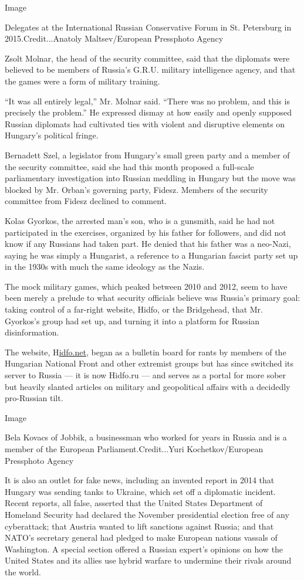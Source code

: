 Image

Delegates at the International Russian Conservative Forum in St.
Petersburg in 2015.Credit...Anatoly Maltsev/European Pressphoto Agency

Zsolt Molnar, the head of the security committee, said that the
diplomats were believed to be members of Russia's G.R.U. military
intelligence agency, and that the games were a form of military
training.

``It was all entirely legal,'' Mr. Molnar said. ``There was no problem,
and this is precisely the problem.'' He expressed dismay at how easily
and openly supposed Russian diplomats had cultivated ties with violent
and disruptive elements on Hungary's political fringe.

Bernadett Szel, a legislator from Hungary's small green party and a
member of the security committee, said she had this month proposed a
full-scale parliamentary investigation into Russian meddling in Hungary
but the move was blocked by Mr. Orban's governing party, Fidesz. Members
of the security committee from Fidesz declined to comment.

Kolas Gyorkos, the arrested man's son, who is a gunsmith, said he had
not participated in the exercises, organized by his father for
followers, and did not know if any Russians had taken part. He denied
that his father was a neo-Nazi, saying he was simply a Hungarist, a
reference to a Hungarian fascist party set up in the 1930s with much the
same ideology as the Nazis.

The mock military games, which peaked between 2010 and 2012, seem to
have been merely a prelude to what security officials believe was
Russia's primary goal: taking control of a far-right website, Hidfo, or
the Bridgehead, that Mr. Gyorkos's group had set up, and turning it into
a platform for Russian disinformation.

The website, H\href{http://hidfo.net/}{idfo.net}, began as a bulletin
board for rants by members of the Hungarian National Front and other
extremist groups but has since switched its server to Russia --- it is
now Hidfo.ru --- and serves as a portal for more sober but heavily
slanted articles on military and geopolitical affairs with a decidedly
pro-Russian tilt.

Image

Bela Kovacs of Jobbik, a businessman who worked for years in Russia and
is a member of the European Parliament.Credit...Yuri Kochetkov/European
Pressphoto Agency

It is also an outlet for fake news, including an invented report in 2014
that Hungary was sending tanks to Ukraine, which set off a diplomatic
incident. Recent reports, all false, asserted that the United States
Department of Homeland Security had declared the November presidential
election free of any cyberattack; that Austria wanted to lift sanctions
against Russia; and that NATO's secretary general had pledged to make
European nations vassals of Washington. A special section offered a
Russian expert's opinions on how the United States and its allies use
hybrid warfare to undermine their rivals around the world.

